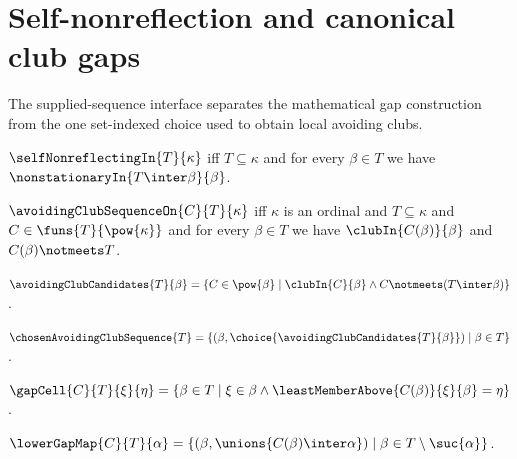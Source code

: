 \section{Self-nonreflection and canonical club gaps}




The supplied-sequence interface separates the mathematical gap construction
from the one set-indexed choice used to obtain local avoiding clubs.

\begin{definition}\label{self_nonreflecting_in}
    $\selfNonreflectingIn{T}{\kappa}$ iff
        $T\subseteq\kappa$ and
        for every $\beta\in T$ we have
            $\nonstationaryIn{T\inter\beta}{\beta}$.
\end{definition}

\begin{definition}\label{avoiding_club_sequence_on}
    $\avoidingClubSequenceOn{C}{T}{\kappa}$ iff
        $\kappa$ is an ordinal and $T\subseteq\kappa$ and
        $C\in\funs{T}{\pow{\kappa}}$ and
        for every $\beta\in T$ we have
            $\clubIn{C(\beta)}{\beta}$ and $C(\beta)\notmeets T$.
\end{definition}

\begin{definition}\label{avoiding_club_candidates}
    $\avoidingClubCandidates{T}{\beta}
        =\{C\in\pow{\beta}\mid
            \clubIn{C}{\beta}\land C\notmeets(T\inter\beta)\}$.
\end{definition}

\begin{definition}\label{chosen_avoiding_club_sequence}
    $\chosenAvoidingClubSequence{T}
        =\{(\beta,\choice{\avoidingClubCandidates{T}{\beta}})
            \mid \beta\in T\}$.
\end{definition}

\begin{definition}\label{gap_cell}
    $\gapCell{C}{T}{\xi}{\eta}
        =\{\beta\in T\mid \xi\in\beta\land
            \leastMemberAbove{C(\beta)}{\xi}{\beta}=\eta\}$.
\end{definition}

\begin{definition}\label{lower_gap_map}
    $\lowerGapMap{C}{T}{\alpha}
        =\{(\beta,\unions{C(\beta)\inter\alpha})
            \mid \beta\in T\setminus\suc{\alpha}\}$.
\end{definition}

